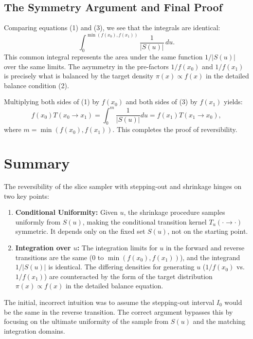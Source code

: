 \documentclass[12pt]{article}
\theoremstyle{definition}
\begin{document}
\subsection{The Symmetry Argument and Final Proof}
Comparing equations (1) and (3), we see that the integrals are identical:
\[
\int_{0}^{\min(f(x_0), f(x_1))} \frac{1}{|S(u)|} \, du.
\]
This common integral represents the area under the same function \( 1/|S(u)| \) over the same limits. The asymmetry in the pre-factors \( 1/f(x_0) \) and \( 1/f(x_1) \) is precisely what is balanced by the target density \( \pi(x) \propto f(x) \) in the detailed balance condition (2).

Multiplying both sides of (1) by \( f(x_0) \) and both sides of (3) by \( f(x_1) \) yields:
\[
f(x_0) T(x_0 \to x_1) = \int_{0}^{m} \frac{1}{|S(u)|} du = f(x_1) T(x_1 \to x_0),
\]
where \( m = \min(f(x_0), f(x_1)) \). This completes the proof of reversibility.

\section{Summary}
The reversibility of the slice sampler with stepping-out and shrinkage hinges on two key points:
\begin{enumerate}
    \item \textbf{Conditional Uniformity:} Given \( u \), the shrinkage procedure samples uniformly from \( S(u) \), making the conditional transition kernel \( T_u(\cdot \to \cdot) \) symmetric. It depends only on the fixed set \( S(u) \), not on the starting point.
    \item \textbf{Integration over \( u \):} The integration limits for \( u \) in the forward and reverse transitions are the same (\( 0 \) to \( \min(f(x_0), f(x_1)) \)), and the integrand \( 1/|S(u)| \) is identical. The differing densities for generating \( u \) (\( 1/f(x_0) \) vs. \( 1/f(x_1) \)) are counteracted by the form of the target distribution \( \pi(x) \propto f(x) \) in the detailed balance equation.
\end{enumerate}
The initial, incorrect intuition was to assume the stepping-out interval \( I_0 \) would be the same in the reverse transition. The correct argument bypasses this by focusing on the ultimate uniformity of the sample from \( S(u) \) and the matching integration domains.
\end{document}
